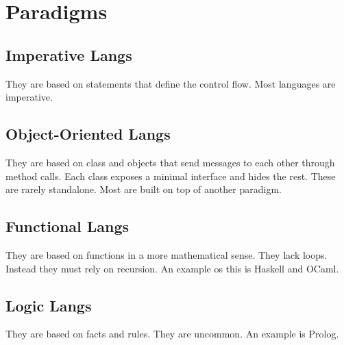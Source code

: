 \section{Paradigms}
\subsection*{Imperative Langs}
They are based on statements that define the control flow. Most
languages are imperative.
\subsection*{Object-Oriented Langs}
They are based on class and objects that send messages to each other
through method calls. Each class exposes a minimal interface and hides
the rest. These are rarely standalone. Most are built on top of
another paradigm.
\subsection*{Functional Langs}
They are based on functions in a more mathematical sense. They lack
loops. Instead they must rely on recursion. An example os this is
Haskell and OCaml.
\subsection*{Logic Langs}
They are based on facts and rules. They are uncommon. An example is
Prolog.